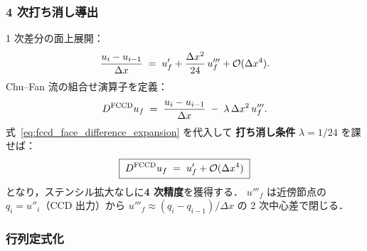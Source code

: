 \subsubsection{4 次打ち消し導出}
\label{sec:fccd_derivation}

1 次差分の面上展開：
\begin{equation}
  \frac{u_i - u_{i-1}}{\Delta x}
  \;=\; u'_f + \frac{\Delta x^2}{24}\,u'''_f + \mathcal{O}(\Delta x^4).
  \label{eq:fccd_face_difference_expansion}
\end{equation}
Chu--Fan 流の組合せ演算子を定義：
\begin{equation}
  D^{\mathrm{FCCD}} u_f
  \;=\; \frac{u_i - u_{i-1}}{\Delta x}
  \;-\; \lambda\,\Delta x^2\,u'''_f.
  \label{eq:fccd_operator}
\end{equation}
式~\eqref{eq:fccd_face_difference_expansion} を代入して \textbf{打ち消し条件}
$\lambda = 1/24$ を課せば：
\begin{equation}
  \boxed{\;
  D^{\mathrm{FCCD}} u_f \;=\; u'_f + \mathcal{O}(\Delta x^4)
  \;}
  \label{eq:fccd_fourth_order}
\end{equation}
となり，ステンシル拡大なしに\textbf{4 次精度}を獲得する．
$u'''_f$ は近傍節点の $q_i = u''_i$（CCD 出力）から
$u'''_f \approx (q_i - q_{i-1})/\Delta x$ の 2 次中心差で閉じる．

\subsubsection{行列定式化}
\label{sec:fccd_matrix}

